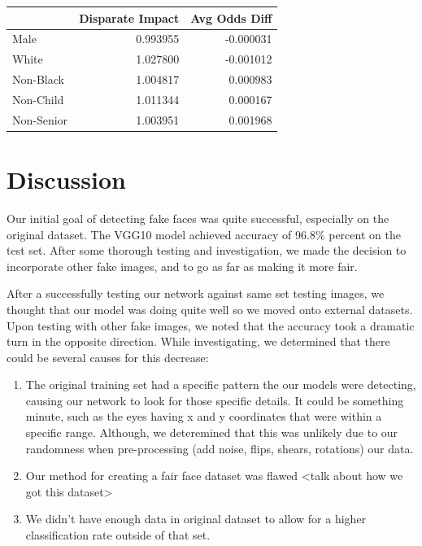 \documentclass[11pt, letterpaper]{article}
\newenvironment{Figure}
  {\par\medskip\noindent\minipage{\linewidth}}
  {\endminipage\par\medskip}
\providecommand{\tightlist}{%
  \setlength{\itemsep}{0pt}\setlength{\parskip}{0pt}
}
\begin{document}
\begin{multicols}{2}
    \begin{Figure}
      \centering
      \label{fairnessmetrics}
      \begin{tabular}{lrr}
      \toprule
      {} &  Disparate Impact &  Avg Odds Diff \\
      \midrule
      Male       &                0.993955 &                -0.000031 \\
      White      &                1.027800 &                -0.001012 \\
      Non-Black  &                1.004817 &                 0.000983 \\
      Non-Child  &                1.011344 &                 0.000167 \\
      Non-Senior &                1.003951 &                 0.001968 \\
      \bottomrule
      \end{tabular}
      \end{Figure}

  \section{Discussion}
  Our initial goal of detecting fake faces was quite successful, especially on
  the original dataset. The VGG10 model achieved accuracy of
  96.8\% percent on the test set. After some thorough testing
  and investigation, we made the decision to incorporate other fake images, and
  to go as far as making it more fair.

  After a successfully testing our network against same set testing images, we
  thought that our model was doing quite well so we moved onto external
  datasets. Upon testing with other fake images, we noted that the accuracy took
  a dramatic turn in the opposite direction. While investigating, we determined
  that there could be several causes for this decrease:

  \begin{enumerate}
    \tightlist
    \item The original training set had a specific pattern the our
      models were detecting, causing our network to look for those
      specific details. It could be something minute, such as the eyes
      having x and y coordinates that were within a specific
      range. Although, we deteremined that this was unlikely due to
      our randomness when pre-processing (add noise, flips, shears,
      rotations) our data.
    \item Our method for creating a fair face dataset was flawed <talk
      about how we got this dataset>
    \item We didn't have enough data in original dataset to allow for
      a higher classification rate outside of that set.
  \end{enumerate}


\end{multicols}
\end{document}

